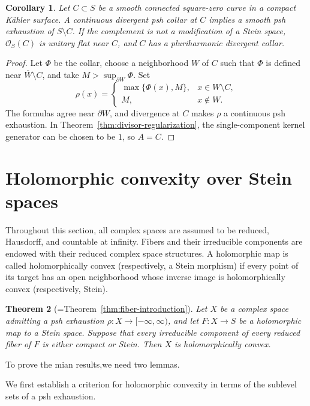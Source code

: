\documentclass[11pt]{amsart}
\newtheorem{theorem}{Theorem}[section]
\newtheorem{corollary}[theorem]{Corollary}
\theoremstyle{definition}
\theoremstyle{remark}
\numberwithin{equation}{section}
\newcommand{\OO}{\mathcal O}
\begin{document}
\begin{corollary}\label{cor:square-zero-continuous-collar}
Let $C\subset S$ be a smooth connected square-zero curve in a compact
K\"ahler surface. A continuous divergent psh collar at $C$ implies
a smooth psh exhaustion of $S\setminus C$. If the complement is not
a modification of a Stein space, $\OO_S(C)$ is unitary flat near $C$,
and $C$ has a pluriharmonic divergent collar.
\end{corollary}
\begin{proof}
Let $\Phi$ be the collar, choose a neighborhood $W$ of $C$ such that
$\Phi$ is defined near $\overline W\setminus C$,
and take $M>\sup_{\partial W}\Phi$. Set
\[
 \rho(x)=
 \begin{cases}\max\{\Phi(x),M\},&x\in W\setminus C,\\
 M,&x\notin W.
 \end{cases}
\]
The formulas agree near $\partial W$, and divergence at $C$ makes
$\rho$ a continuous psh exhaustion. In
Theorem~\ref{thm:divisor-regularization}, the single-component kernel
generator can be chosen to be $1$, so $A=C$.
\end{proof}

\section{Holomorphic convexity over Stein spaces}
\label{sec:curve-fibers}


Throughout this section, all complex spaces are assumed to be reduced, Hausdorff, and countable at infinity. Fibers and their irreducible components are endowed with their reduced complex space structures. A holomorphic map is called holomorphically convex (respectively, a Stein morphism) if every point of its target has an open neighborhood whose inverse image is holomorphically convex (respectively, Stein).

\begin{theorem}[=Theorem~\ref{thm:fiber-introduction}]
\label{thm:fiber-convexity}
Let $X$ be a complex space admitting a psh exhaustion
$\rho:X\to[-\infty,\infty)$, and let $F:X\to S$ be a
holomorphic map to a Stein space.
Suppose that every irreducible component of every reduced
fiber of $F$ is either compact or Stein.
Then $X$ is holomorphically convex.
\end{theorem}
To prove the mian results,we need two lemmas.

We first establish a criterion for holomorphic convexity
in terms of the sublevel sets of a psh exhaustion.
\end{document}
